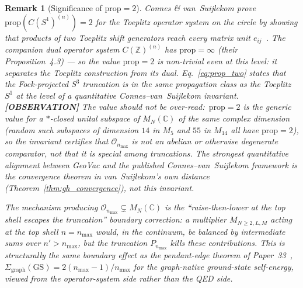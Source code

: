 \documentclass[11pt]{article}
\newtheorem{remark}{Remark}
\begin{document}
\begin{remark}[Significance of $\mathrm{prop} = 2$]
Connes \& van~Suijlekom prove $\mathrm{prop}(C(S^1)^{(n)}) = 2$ for
the Toeplitz operator system on the circle by showing that products
of two Toeplitz shift generators reach every matrix unit
$e_{ij}$~\cite{connes_vs2021}.  The companion dual operator system
$C(\mathbb{Z})^{(n)}$ has $\mathrm{prop} = \infty$ (their
Proposition~4.3) — so the value $\mathrm{prop} = 2$ is non-trivial
even at this level: it separates the Toeplitz construction from its
dual.  Eq.~\eqref{eq:prop_two} states that the Fock-projected $S^3$
truncation is in the same propagation class as the Toeplitz $S^1$ at
the level of a quantitative Connes--van~Suijlekom invariant.
\textbf{[OBSERVATION]} The value should not be over-read:\ $\mathrm{prop}
= 2$ is the \emph{generic} value for a $*$-closed unital subspace of
$M_N(\mathbb{C})$ of the same complex dimension (random such subspaces
of dimension $14$ in $M_5$ and $55$ in $M_{14}$ all have $\mathrm{prop}
= 2$), so the invariant certifies that $\mathcal{O}_{n_{\max}}$
is not an abelian or otherwise degenerate comparator, not that it is
special among truncations.  The strongest quantitative alignment between
GeoVac and the published Connes--van~Suijlekom framework is the
convergence theorem in van~Suijlekom's own distance
(Theorem~\ref{thm:gh_convergence}), not this invariant.

The mechanism producing
$\mathcal{O}_{n_{\max}} \subsetneq M_N(\mathbb{C})$ is the
``raise-then-lower at the top shell escapes the truncation'' boundary
correction: a multiplier $M_{N \ge 2, L, M}$ acting at the top shell
$n = n_{\max}$ would, in the continuum, be balanced by intermediate
sums over $n' > n_{\max}$, but the truncation $P_{n_{\max}}$ kills
these contributions.  This is structurally the same boundary effect
as the pendant-edge theorem of Paper~33~\cite{paper33},
$\Sigma_{\mathrm{graph}}(\mathrm{GS}) = 2(n_{\max} - 1)/n_{\max}$ for
the graph-native ground-state self-energy, viewed from the
operator-system side rather than the QED side.
\end{remark}
\end{document}
